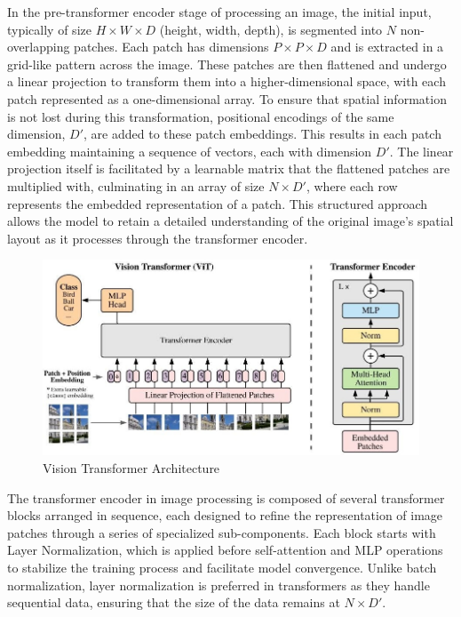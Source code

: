 In the pre-transformer encoder stage of processing an image, the initial input, typically of size \(H \times W \times D\) (height, width, depth), 
is segmented into \(N\) non-overlapping patches. Each patch has dimensions \(P \times P \times D\) and is extracted in a grid-like pattern across 
the image. These patches are then flattened and undergo a linear projection to transform them into a higher-dimensional space, with each patch represented 
as a one-dimensional array. To ensure that spatial information is not lost during this transformation, positional encodings of the same dimension, 
\(D'\), are added to these patch embeddings. This results in each patch embedding maintaining a sequence of vectors, each with dimension \(D'\). 
The linear projection itself is facilitated by a learnable matrix that the flattened patches are multiplied with, culminating in an array of size 
\(N \times D'\), where each row represents the embedded representation of a patch. This structured approach allows the model to retain a detailed 
understanding of the original image’s spatial layout as it processes through the transformer encoder.


\begin{figure}[h!]
    \centering
    \includegraphics[scale=0.45]{Figures/vision-transformer.jpg}
    \caption{Vision Transformer Architecture \cite{visiontr}}
    \label{fig:tr-vit}
\end{figure}


The transformer encoder in image processing is composed of several transformer blocks arranged in sequence, each designed to refine the representation of image 
patches through a series of specialized sub-components. Each block starts with Layer Normalization, which is applied before self-attention and MLP operations 
to stabilize the training process and facilitate model convergence. Unlike batch normalization, layer normalization is preferred in transformers as they handle 
sequential data, ensuring that the size of the data remains at \(N \times D'\).

